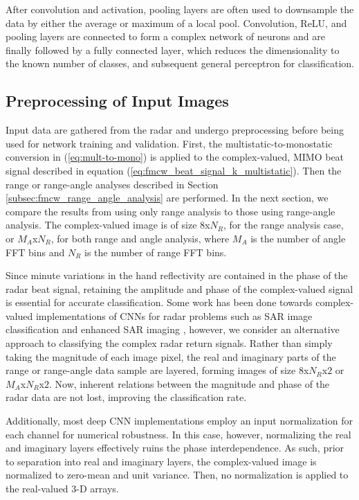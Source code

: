 \documentclass{ieeeaccess}
\begin{document}
After convolution and activation, pooling layers are often used to downsample the data by either the average or maximum of a local pool. Convolution, ReLU, and pooling layers are connected to form a complex network of neurons and are finally followed by a fully connected layer, which reduces the dimensionality to the known number of classes, and subsequent general perceptron for classification.

\subsection{Preprocessing of Input Images}
\label{subsec:cnn_input_images:complex_beat_signal}
Input data are gathered from the radar and undergo preprocessing before being used for network training and validation. First, the multistatic-to-monostatic conversion in (\ref{eq:mult-to-mono}) is applied to the complex-valued, MIMO beat signal described in equation (\ref{eq:fmcw_beat_signal_k_multistatic}). Then the range or range-angle analyses described in Section \ref{subsec:fmcw_range_angle_analysis} are performed. In the next section, we compare the results from using only range analysis to those using range-angle analysis. The complex-valued image is of size $8$x$N_R$, for the range analysis case, or $M_A$x$N_R$, for both range and angle analysis, where $M_A$ is the number of angle FFT bins and $N_R$ is the number of range FFT bins. 

Since minute variations in the hand reflectivity are contained in the phase of the radar beat signal, retaining the amplitude and phase of the complex-valued signal is essential for accurate classification. Some work has been done towards complex-valued implementations of CNNs for radar problems such as SAR image classification \cite{cvcnn:sar_classification} and enhanced SAR imaging \cite{cvcnn:sar_imaging}, however, we consider an alternative approach to classifying the complex radar return signals. Rather than simply taking the magnitude of each image pixel, the real and imaginary parts of the range or range-angle data sample are layered, forming images of size $8$x$N_R$x$2$ or $M_A$x$N_R$x$2$. Now, inherent relations between the magnitude and phase of the radar data are not lost, improving the classification rate. 

Additionally, most deep CNN implementations employ an input normalization for each channel for numerical robustness. In this case, however, normalizing the real and imaginary layers effectively ruins the phase interdependence. As such, prior to separation into real and imaginary layers, the complex-valued image is normalized to zero-mean and unit variance. Then, no normalization is applied to the real-valued 3-D arrays.
\end{document}

